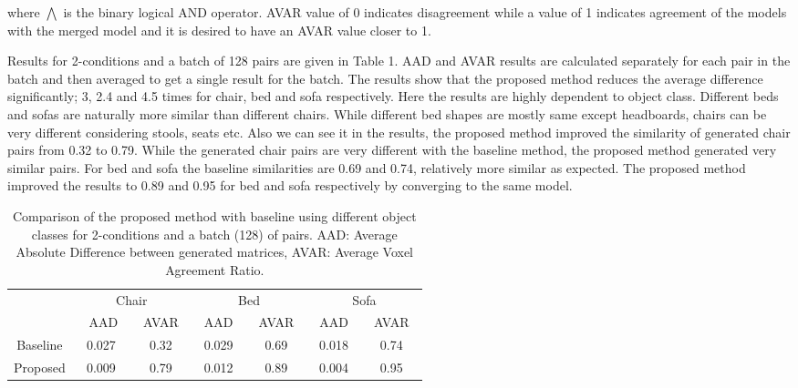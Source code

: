 \documentclass[runningheads]{llncs}
\begin{document}
where $\bigwedge $ is the binary logical AND operator. AVAR value of 0 indicates disagreement while a value of 1 indicates agreement of the models with the merged model and it is desired to have an AVAR value closer to 1.

Results for 2-conditions and a batch of 128 pairs are given in Table 1. AAD and AVAR results are calculated separately for each pair in the batch and then averaged to get a single result for the batch. The results show that the proposed method reduces the average difference significantly; 3, 2.4 and 4.5 times for chair, bed and sofa respectively. Here the results are highly dependent to object class. Different beds and sofas are naturally more similar than different chairs. While different bed shapes are mostly same except headboards, chairs can be very different considering stools, seats etc. Also we can see it in the results, the proposed method improved the similarity of generated chair pairs from 0.32 to 0.79. While the generated chair pairs are very different with the baseline method, the proposed method generated very similar pairs. For bed and sofa the baseline similarities are 0.69 and 0.74, relatively more similar as expected. The proposed method improved the results to 0.89 and 0.95 for bed and sofa respectively by converging to the same model. 
\begin{table}
\caption{Comparison of the proposed method with baseline using different object classes for 2-conditions and a batch (128) of pairs. AAD: Average Absolute Difference between generated matrices, AVAR: Average Voxel Agreement Ratio.}\label{tab1}
\centering

\normalsize
\begin{tabular}{|c|c|c|c|c|c|c|}
\hline
\multirow{2}{*}{} & \multicolumn{2}{c|}{Chair} & \multicolumn{2}{c|}{Bed} & \multicolumn{2}{c|}{Sofa} \\ \cline{2-7} 
                  &~ AAD~          & ~AVAR~        & ~AAD~         & ~AVAR~       & ~AAD~          & ~AVAR~       \\ \hhline{|-|=|=|=|=|=|=|}
Baseline          & 0.027        & 0.32        & 0.029       & 0.69       & 0.018        & 0.74       \\ \hline
Proposed          & 0.009        & 0.79        & 0.012       & 0.89       & 0.004        & 0.95       \\ \hline
\end{tabular}%

\end{table}
\end{document}
